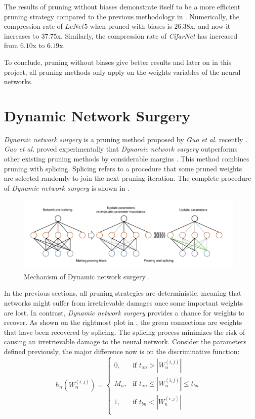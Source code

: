 \documentclass[a4paper,12pt]{report}
\begin{document}
The results of pruning without biases demonstrate itself to be a more efficient pruning
strategy compared to the previous methodology in \label{prune_without_biase}.
Numerically, the compression rate of $LeNet5$ when pruned with biases is $26.38$x,
and now it increases to $37.75$x.
Similarly, the compression rate of \textit{CifarNet} has increased from $6.10$x
to $6.19$x.

To conclude, pruning without biases give better results and later on in this
project, all pruning methods only apply on the weights variables of the neural
networks.

\section{Dynamic Network Surgery}
\textit{Dynamic network surgery} is a pruning method proposed by \textit{Guo et
al.} recently \cite{Guo}.
\textit{Guo et al.} proved experimentally that \textit{Dynamic network surgery}
outperforms other existing pruning methods by considerable margins \cite{Guo}.
This method combines pruning with splicing.
Splicing refers to a procedure that some pruned weights are selected randomly to
join the next pruning iteration.
The complete procedure of \textit{Dynamic network surgery} is shown in
.

\begin{figure}[!h]
  \includegraphics[width=\textwidth]{fig_dns.png}
  \caption{Mechanism of Dynamic network surgery \cite{Guo}.}
  \label{fig:dynamic_network_surgery}
\end{figure}

In the previous sections, all pruning strategies are deterministic,
meaning that networks might suffer from irretrievable damages once some
important weights are lost.
In contrast, \textit{Dynamic network surgery} provides a chance for weights to
recover.
As shown on the rightmost plot in , the green
connections are weights that have been recovered by splicing.
The splicing process minimizes the risk of causing an irretrievable damage to the
neural network.
Consider the parameters defined previously, the major difference now is on
the discriminative function:
\begin{equation}
  h_n(W_n^{(i,j)}) =
  \begin{cases}
    0, &\text{if } t_{an} > |W_n^{(i,j)}| \\
    M_n, &\text{if } t_{an} \leq |W_n^{(i,j)}| \leq t_{bn}\\
    1, &\text{if } t_{bn} < |W_n^{(i,j)}| \\
  \end{cases}
  \label{equ:hfunc_ds}
\end{equation}
\end{document}
